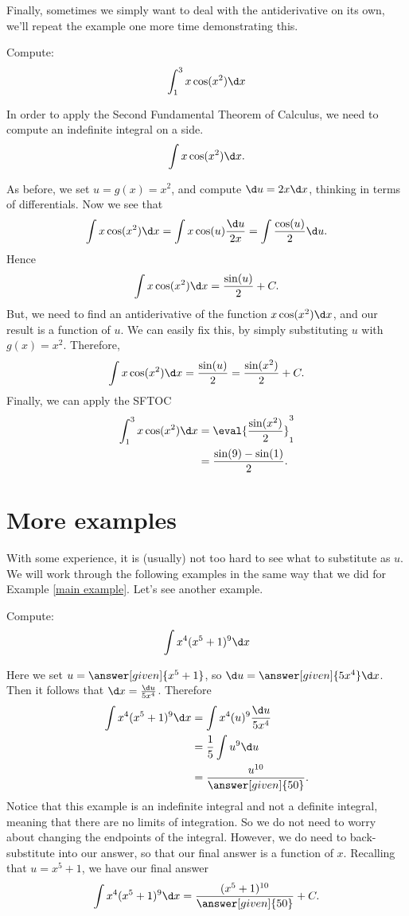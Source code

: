 \documentclass{ximera}
\begin{document}
Finally, sometimes we simply want to deal with the antiderivative on
its own, we'll repeat the example one more time demonstrating this.

\begin{example}
Compute:
\[
\int_1^3 x\cos(x^2)\d x
\]
\begin{explanation}
In order to apply the Second Fundamental Theorem of Calculus, we need to compute an indefinite integral on a side.
\[
\int x \cos(x^2) \d x.
\]

As before, we set $u=g(x)=x^2$, and compute $\d u =  2x \d x$,
 thinking in terms of differentials. Now we see that
\[
\int x \cos(x^2) \d x = \int x \cos(u) \frac{\d u}{2x} = \int \frac{\cos(u)}{2}\d u .
\]
Hence 
\[
\int x\cos(x^2)\d x = \frac{\sin(u)}{2}+C .
\]
But, we need to find an antiderivative of the function $ x \cos(x^2) \d x$, and our result is a function of $u$.
We can easily fix this, by simply substituting $u$ with $g(x)=x^2$.
Therefore,
\[
\int x\cos(x^2)\d x = \frac{\sin(u)}{2}= \frac{\sin(x^2)}{2}+C .
\]
Finally, we can apply the SFTOC
\begin{align*}
\int_1^3 x\cos(x^2)\d x &=\eval{\frac{\sin(x^2)}{2}}_1^3\\
&= \frac{\sin(9) -\sin(1)}{2}.
\end{align*}
\end{explanation}
\end{example}

\section{More examples}

With some experience, it is (usually) not too hard to see what to
substitute as $u$.  We will work through the following examples in the
same way that we did for Example \ref{main example}. Let's see another
example.

\begin{example}
Compute:
\[
\int x^4(x^5+1)^{9} \d x
\]
\begin{explanation}
Here we set $u =  \answer[given]{x^5+1}$, so $\d u =  \answer[given]{5x^4} \d x$.  Then
it follows that $\d x=\frac{\d u}{5x^4}$. Therefore
\begin{align*}
  \int x^4(x^5+1)^{9} \d x &= \int x^4 (u)^{9} \frac{\d u}{5x^4} \\
  &= \frac{1}{5} \int u^{9} \d u\\
&=\frac{u^{10}}{ \answer[given]{50}}.
\end{align*}
Notice that this example is an indefinite integral and not a definite
integral, meaning that there are no limits of integration.  So we do
not need to worry about changing the endpoints of the integral.  However,
we do need to back-substitute into our answer, so that our final
answer is a function of $x$.  Recalling that $u= x^5+1$, we have
our final answer
\[
\int x^4(x^5+1)^{9} \d x= \frac{(x^5+1)^{10}}{\answer[given]{50}}+C.
\]
\end{explanation}
\end{example}
\end{document}
